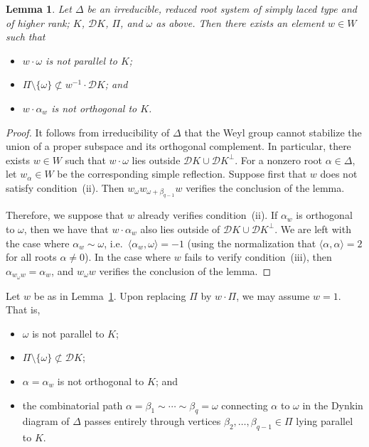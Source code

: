 \documentclass{amsart}
\theoremstyle{plain}
\newtheorem{lemma}[theorem]{Lemma}
\theoremstyle{definition}
\theoremstyle{remark}
\begin{document}
\begin{lemma}\label{lem:alpha-omega}
Let $\Delta$ be an irreducible, reduced root system of simply laced type and of higher
rank; $K$, $\mathscr{D}K$, $\Pi$, and $\omega$ as above. Then there exists an element $w
\in W$ such that
\begin{itemize}
\item[(i)] $w \cdot \omega$ is not parallel to $K$;
\item[(ii)] $\Pi \setminus \{\omega\} \not \subset w^{-1} \cdot \mathscr{D}K$;
and
\item[(iii)] $w \cdot \alpha_{w}$ is not orthogonal to $K$.
\end{itemize}
\end{lemma}
\begin{proof}
It follows from irreducibility of $\Delta$ that
the Weyl group cannot stabilize the union of a proper subspace and its
orthogonal complement. In particular, there exists $w \in W$ such that $w \cdot \omega$
lies outside $\mathscr{D}K \cup \mathscr{D}K^{\perp}$. For a nonzero root $\alpha \in
\Delta$, let $w_{\alpha} \in W$ be
the corresponding simple reflection. Suppose first that $w$ does not
satisfy condition~(ii). Then $w_{\omega}w_{\omega + \beta_{q - 1}}w$ verifies the
conclusion of the lemma.

Therefore, we suppose that $w$ already verifies condition~(ii).
If $\alpha_{w}$ is orthogonal to $\omega$, then we have that $w \cdot \alpha_{w}$ also
lies outside of $\mathscr{D}K \cup \mathscr{D}K^{\perp}$. We are left with the case
where $\alpha_{w} \sim \omega$, i.e.\ $\langle \alpha_{w}, \omega \rangle =
-1$ (using the normalization that $\langle \alpha, \alpha \rangle = 2$ for all roots
$\alpha
\neq 0$). In the case where $w$ fails to verify condition~(iii), then
$\alpha_{w_{\omega}w} = \alpha_{w}$, and $w_{\omega}w$ verifies the
conclusion of the lemma.
\end{proof}

Let $w$ be as in Lemma~\ref{lem:alpha-omega}. Upon replacing $\Pi$ by $w \cdot \Pi$, we may assume $w =
1$. That is, 
\begin{itemize}
\item[(CD1)] $\omega$ is not parallel to $K$;
\item[(CD2)] $\Pi \setminus \{\omega\} \not \subset \mathscr{D}K$;
\item[(CD3)] $\alpha = \alpha_{w}$ is not orthogonal to $K$; and
\item[(CD4)] the combinatorial path
$\alpha = \beta_{1} \sim \cdots \sim \beta_{q} = \omega$ 
connecting $\alpha$ to $\omega$ in the Dynkin diagram of $\Delta$ passes entirely
through vertices $\beta_{2}, \ldots, \beta_{q - 1} \in \Pi$ lying parallel to $K$.
\end{itemize}
\end{document}
